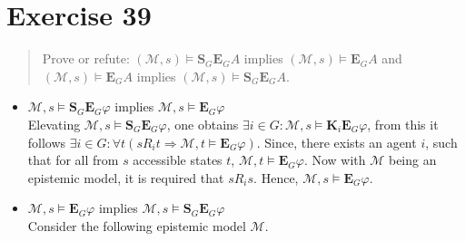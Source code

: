 \documentclass[11pt,a4paper]{article}
\newcommand{\eall}{\mathbf{K}}
\newcommand{\edisp}{\mathbf{S}}
\newcommand{\egen}{\mathbf{E}}
\newcommand{\sto}{\Rightarrow}
\begin{document}
\section*{Exercise 39}
\begin{quote}
Prove or refute: $(\mathcal{M},s) \models \edisp_G \egen_G A$ implies $(\mathcal{M},s) \models \egen_G A$ and $(\mathcal{M},s) \models \egen_G A$ implies $(\mathcal{M},s) \models \edisp_G \egen_G A$.
\end{quote}

\begin{itemize}
\item $\mathcal{M},s \models \edisp_G \egen_G \varphi$ implies $\mathcal{M},s \models \egen_G \varphi$\\
Elevating $\mathcal{M},s \models \edisp_G \egen_G \varphi$, one obtains $\exists i \in G : \mathcal{M},s \models \eall_i \egen_G \varphi$, from this it follows $\exists i \in G : \forall t (sR_it \sto \mathcal{M},t \models \egen_G \varphi)$.
Since, there exists an agent $i$, such that for all from $s$ accessible states $t$, $\mathcal{M},t \models \egen_G \varphi$. Now with $\mathcal{M}$ being an epistemic model, it is required that $sR_is$. Hence, $\mathcal{M},s \models \egen_G \varphi$.


\item $\mathcal{M},s \models \egen_G \varphi$ implies $\mathcal{M},s \models \edisp_G \egen_G \varphi$\\
Consider the following epistemic model $\mathcal{M}$.
\begin{center}
\end{center}
\end{itemize}
\end{document}
